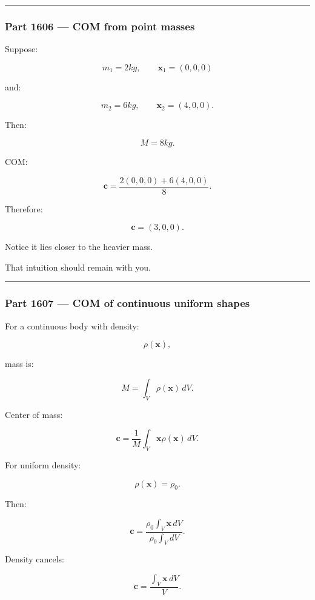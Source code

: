 \begin{center}\rule{0.5\linewidth}{0.5pt}\end{center}

\subsubsection{Part 1606 --- COM from point masses}\label{part-1606-com-from-point-masses}

Suppose:

\[
m_1=2kg,\qquad
\mathbf{x}_1=(0,0,0)
\]

and:

\[
m_2=6kg,\qquad
\mathbf{x}_2=(4,0,0).
\]

Then:

\[
M=8kg.
\]

COM:

\[
\mathbf{c}
=
\frac{
2(0,0,0)+6(4,0,0)
}{8}.
\]

Therefore:

\[
\boxed{
\mathbf{c}=(3,0,0).
}
\]

Notice it lies closer to the heavier mass.

That intuition should remain with you.

\begin{center}\rule{0.5\linewidth}{0.5pt}\end{center}

\subsubsection{Part 1607 --- COM of continuous uniform shapes}\label{part-1607-com-of-continuous-uniform-shapes}

For a continuous body with density:

\[
\rho(\mathbf{x}),
\]

mass is:

\[
M
=
\int_V
\rho(\mathbf{x})\,dV.
\]

Center of mass:

\[
\boxed{
\mathbf{c}
=
\frac{1}{M}
\int_V
\mathbf{x}\rho(\mathbf{x})\,dV.
}
\]

For uniform density:

\[
\rho(\mathbf{x})=\rho_0.
\]

Then:

\[
\mathbf{c}
=
\frac{
\rho_0\int_V\mathbf{x}\,dV
}{
\rho_0\int_VdV
}.
\]

Density cancels:

\[
\mathbf{c}
=
\frac{
\int_V\mathbf{x}\,dV
}{
V
}.
\]

